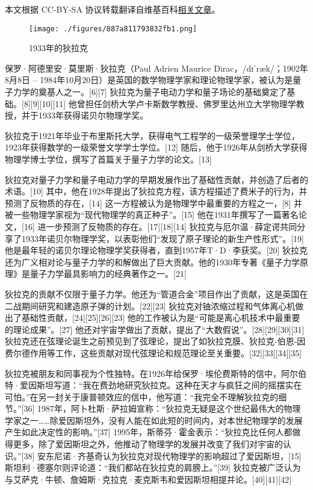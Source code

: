 
本文根据 CC-BY-SA 协议转载翻译自维基百科\href{https://en.wikipedia.org/wiki/Paul_Dirac}{相关文章}。


\begin{figure}[ht]
\centering
\texttt{[image: ./figures/887a811793832fb1.png]}
\caption{1933年的狄拉克} \label{fig_DLK1_1}
\end{figure}
保罗·阿德里安·莫里斯·狄拉克（Paul Adrien Maurice Dirac，/dɪˈræk/；1902年8月8日 – 1984年10月20日）是英国的数学物理学家和理论物理学家，被认为是量子力学的奠基人之一。[6][7] 狄拉克为量子电动力学和量子场论的基础奠定了基础。[8][9][10][11] 他曾担任剑桥大学卢卡斯数学教授、佛罗里达州立大学物理学教授，并于1933年获得诺贝尔物理学奖。

狄拉克于1921年毕业于布里斯托大学，获得电气工程学的一级荣誉理学士学位，1923年获得数学的一级荣誉文学学士学位。[12] 随后，他于1926年从剑桥大学获得物理学博士学位，撰写了首篇关于量子力学的论文。[13]

狄拉克对量子力学和量子电动力学的早期发展作出了基础性贡献，并创造了后者的术语。[10] 其中，他在1928年提出了狄拉克方程，该方程描述了费米子的行为，并预测了反物质的存在，[14] 这一方程被认为是物理学中最重要的方程之一，[8] 并被一些物理学家视为“现代物理学的真正种子”。[15] 他在1931年撰写了一篇著名论文，[16] 进一步预测了反物质的存在。[17][18][14] 狄拉克与厄尔温·薛定谔共同分享了1933年诺贝尔物理学奖，以表彰他们“发现了原子理论的新生产性形式”。[19] 他是最年轻的诺贝尔理论物理学奖获得者，直到1957年T·D·李获奖。[20] 狄拉克还为广义相对论与量子力学的和解做出了巨大贡献。他的1930年专著《量子力学原理》是量子力学最具影响力的经典著作之一。[21]

狄拉克的贡献不仅限于量子力学。他还为“管道合金”项目作出了贡献，这是英国在二战期间研究和建造原子弹的计划。[22][23] 狄拉克对铀浓缩过程和气体离心机做出了基础性贡献，[24][25][26][23] 他的工作被认为是“可能是离心机技术中最重要的理论成果”。[27] 他还对宇宙学做出了贡献，提出了“大数假说”。[28][29][30][31] 狄拉克还在弦理论诞生之前预见到了弦理论，提出了如狄拉克膜、狄拉克-伯恩-因费尔德作用等工作，这些贡献对现代弦理论和规范理论至关重要。[32][33][34][35]

狄拉克被朋友和同事视为个性独特。在1926年给保罗·埃伦费斯特的信中，阿尔伯特·爱因斯坦写道：“我在费劲地研究狄拉克。这种在天才与疯狂之间的摇摆实在可怕。”在另一封关于康普顿效应的信中，他写道：“我完全不理解狄拉克的细节。”[36] 1987年，阿卜杜斯·萨拉姆宣称：“狄拉克无疑是这个世纪最伟大的物理学家之一……除爱因斯坦外，没有人能在如此短的时间内，对本世纪物理学的发展产生如此决定性的影响。”[37] 1995年，斯蒂芬·霍金表示：“狄拉克比任何人都做得更多，除了爱因斯坦之外，他推动了物理学的发展并改变了我们对宇宙的认识。”[38] 安东尼诺·齐基奇认为狄拉克对现代物理学的影响超过了爱因斯坦，[15] 斯坦利·德塞尔则评论道：“我们都站在狄拉克的肩膀上。”[39] 狄拉克被广泛认为与艾萨克·牛顿、詹姆斯·克拉克·麦克斯韦和爱因斯坦相提并论。[40][41][42]
